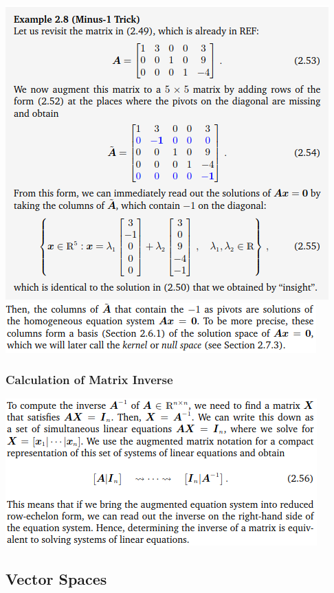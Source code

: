 \documentclass[oneside,10pt]{scrartcl}
\begin{document}
\begin{multicols*}{2}
\includegraphics[width=\linewidth]{2.3_3}
\includegraphics[width=\linewidth]{2.3_6}

\subsubsection*{Calculation of Matrix Inverse}
\includegraphics[width=\linewidth]{2.3_4}


\subsection{Vector Spaces}

\end{multicols*}
\end{document}
